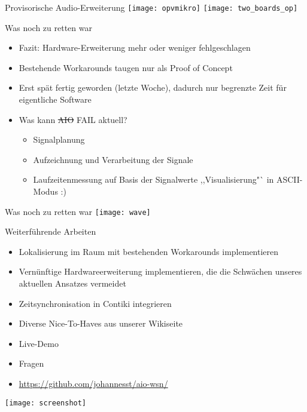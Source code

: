 \documentclass[fleqn,11pt]{beamer}
\begin{document}
\begin{frame}{Provisorische Audio-Erweiterung}
	\texttt{[image: opvmikro]}
	\texttt{[image: two\_boards\_op]}
      \end{frame}
      \begin{frame}{Was noch zu retten war}
	\begin{itemize}
	  \item	    Fazit: Hardware-Erweiterung mehr oder weniger fehlgeschlagen
	  \item Bestehende Workarounds taugen nur als Proof of Concept
	  \item   Erst spät fertig geworden (letzte Woche), dadurch nur
	           begrenzte  Zeit für eigentliche Software
		 \item Was kann \sout{AIO} FAIL aktuell?
		   \begin{itemize}
		     \item 	       Signalplanung
	          \item  Aufzeichnung und Verarbeitung der Signale
		  \item   Laufzeitenmessung auf Basis der Signalwerte
		        ,,Visualisierung"` in ASCII-Modus :)

	\end{itemize}
	\end{itemize}
      \end{frame}
      \begin{frame}{Was noch zu retten war}
	\texttt{[image: wave]}
      \end{frame}
      \begin{frame}{Weiterführende Arbeiten}

	\begin{itemize}
      \item Lokalisierung im Raum mit bestehenden Workarounds
	implementieren
      \item Vernünftige Hardwareerweiterung implementieren, die die
	Schwächen unseres aktuellen Ansatzes vermeidet
      \item Zeitsynchronisation in Contiki integrieren
      \item Diverse Nice-To-Haves aus unserer Wikiseite
    \end{itemize}
      \end{frame}
      \begin{frame}
	\begin{itemize} \Large
	  \item Live-Demo
	  \item Fragen
	  \item \url{https://github.com/johannesst/aio-wsn/}
	\end{itemize}
      \end{frame}
      \begin{frame}
	\begin{center}
	\texttt{[image: screenshot]}
      \end{center}
      \end{frame}
\end{document}
